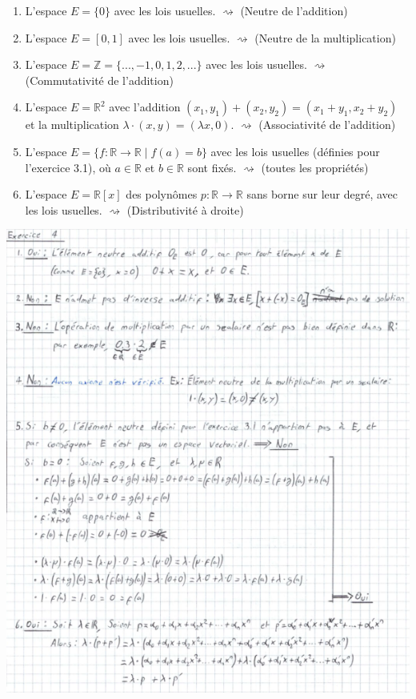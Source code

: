 \documentclass[a4paper, 10pt]{report}
\begin{document}
	\begin{enumerate}[label=\arabic*.]
		\item L'espace $E = \{0\}$ avec les lois usuelles.
			$\rightsquigarrow$ (Neutre de l'addition)
		\item L'espace $E = [0, 1]$ avec les lois usuelles.
			$\rightsquigarrow$ (Neutre de la multiplication)
		\item L'espace $E = \mathbb{Z} = \{..., -1, 0, 1, 2, ...\}$
		avec les lois usuelles.
			$\rightsquigarrow$ (Commutativité de l'addition)
		\item L'espace $E = \mathbb{R}^2$ avec
		l'addition $(x_1, y_1) + (x_2, y_2) = (x_1 + y_1, x_2 + y_2)$ et
		la multiplication $\lambda \cdot (x, y) = (\lambda x, 0)$.
			$\rightsquigarrow$ (Associativité de l'addition)
		\item L'espace $E = \{f : \mathbb{R} \rightarrow \mathbb{R} \mid f(a) = b\}$
		avec les lois usuelles (définies pour l'exercice 3.1),
		où $a \in \mathbb{R}$ et $b \in \mathbb{R}$ sont fixés.
			$\rightsquigarrow$ (toutes les propriétés)
		\item L'espace $E = \mathbb{R}[x]$ des polynômes
		$p : \mathbb{R} \rightarrow \mathbb{R}$ sans borne sur leur degré,
		avec les lois usuelles.
			$\rightsquigarrow$ (Distributivité à droite)
	\end{enumerate}
	
	
	\includegraphics{ex04.png}
\end{document}
